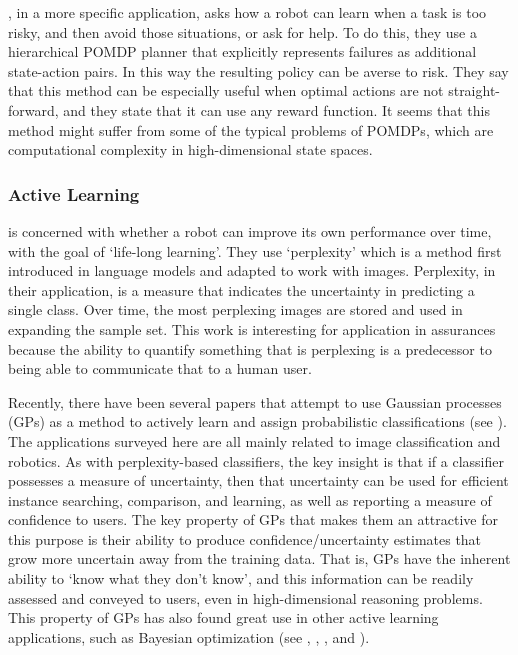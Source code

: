     \citet{Curran2016-ij}, in a more specific application, asks how a robot can learn when a task is too risky, and then avoid those situations, or ask for help. To do this, they use a hierarchical POMDP planner that explicitly represents failures as additional state-action pairs. In this way the resulting policy can be averse to risk. They say that this method can be especially useful when optimal actions are not straight-forward, and they state that it can use any reward function. It seems that this method might suffer from some of the typical problems of POMDPs, which are computational complexity in high-dimensional state spaces.

\subsubsection{Active Learning} \label{sec:active_learning}
    \citet{Paul2011-vr} is concerned with whether a robot can improve its own performance over time, with the goal of `life-long learning'. They use `perplexity' which is a method first introduced in language models and adapted to work with images. Perplexity, in their application, is a measure that indicates the uncertainty in predicting a single class. Over time, the most perplexing images are stored and used in expanding the sample set. This work is interesting for application in assurances because the ability to quantify something that is perplexing is a predecessor to being able to communicate that to a human user.

    Recently, there have been several papers that attempt to use Gaussian processes (GPs) as a method to actively learn and assign probabilistic classifications (see \citet{MacKay1992-sp,Triebel2016-kj,Triebel2013-ow,Triebel2013-ku,Grimmett2013-gj,Grimmett2016-yc,Berczi2015-rd,Dequaire2016-kh}). The applications surveyed here are all mainly related to image classification and robotics. As with perplexity-based classifiers, the key insight is that if a classifier possesses a measure of uncertainty, then that uncertainty can be used for efficient instance searching, comparison, and learning, as well as reporting a measure of confidence to users. The key property of GPs that makes them an attractive for this purpose is their ability to produce confidence/uncertainty estimates that grow more uncertain away from the training data. That is, GPs have the inherent ability to `know what they don't know', and this information can be readily assessed and conveyed to users, even in high-dimensional reasoning problems. This property of GPs has also found great use in other active learning applications, such as  Bayesian optimization (see \citet{Williams1998-kr}, \citet{Snoek2012-tt}, \citet{Brochu2010-tj}, and \citet{Israelsen2017-zb}).

